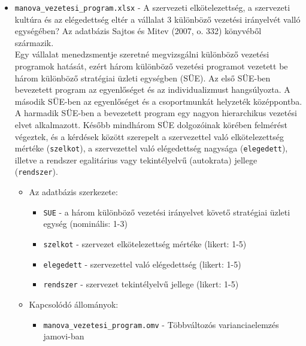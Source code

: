 \documentclass[
  letterpaper,
]{krantz}
\providecommand{\tightlist}{%
  \setlength{\itemsep}{0pt}\setlength{\parskip}{0pt}}\usepackage{longtable,booktabs,array}
\begin{document}
\begin{itemize}
\item
  \texttt{manova\_vezetesi\_program.xlsx} - A szervezeti
  elkötelezettség, a szervezeti kultúra és az elégedettség eltér a
  vállalat 3 különböző vezetési irányelvét valló egységében? Az
  adatbázis Sajtos és Mitev (2007, o. 332) könyvéből származik.\\
  Egy vállalat menedzsmentje szeretné megvizsgálni különböző vezetési
  programok hatását, ezért három különböző vezetési programot vezetett
  be három különböző stratégiai üzleti egységben (SÜE). Az első SÜE-ben
  bevezetett program az egyenlőséget és az individualizmust
  hangsúlyozta. A második SÜE-ben az egyenlőséget és a csoportmunkát
  helyzeték középpontba. A harmadik SÜE-ben a bevezetett program egy
  nagyon hierarchikus vezetési elvet alkalmazott. Később mindhárom SÜE
  dolgozóinak körében felmérést végeztek, és a kérdések között szerepelt
  a szervezettel való elkötelezettség mértéke (\texttt{szelkot}), a
  szervezettel való elégedettség nagysága (\texttt{elegedett}), illetve
  a rendszer egalitárius vagy tekintélyelvű (autokrata) jellege
  (\texttt{rendszer}).

  \begin{itemize}
  \item
    Az adatbázis szerkezete:

    \begin{itemize}
    \tightlist
    \item
      \texttt{SUE} - a három különböző vezetési irányelvet követő
      stratégiai üzleti egység (nominális: 1-3)
    \item
      \texttt{szelkot} - szervezet elkötelezettség mértéke (likert: 1-5)
    \item
      \texttt{elegedett} - szervezettel való elégedettség (likert: 1-5)
    \item
      \texttt{rendszer} - szervezet tekintélyelvű jellege (likert: 1-5)
    \end{itemize}
  \item
    Kapcsolódó állományok:

    \begin{itemize}
    \tightlist
    \item
      \texttt{manova\_vezetesi\_program.omv} - Többváltozós
      varianciaelemzés jamovi-ban
    \end{itemize}
  \end{itemize}
\end{itemize}
\end{document}
